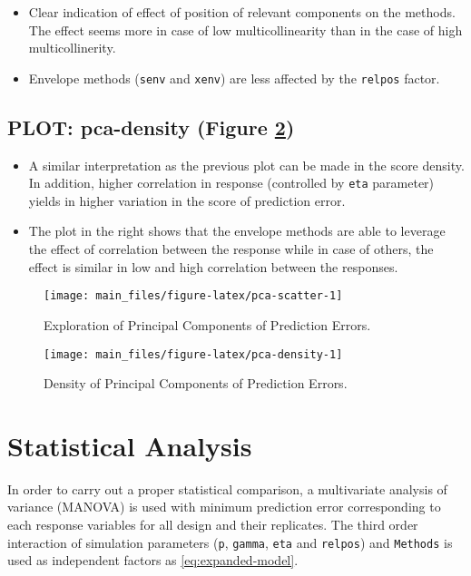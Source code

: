 \documentclass[12pt,3p,authoryear]{elsarticle}
\providecommand{\tightlist}{%
  \setlength{\itemsep}{0pt}\setlength{\parskip}{0pt}}
\begin{document}
\begin{itemize}
\tightlist
\item
  Clear indication of effect of position of relevant components on the
  methods. The effect seems more in case of low multicollinearity than
  in the case of high multicollinerity.
\item
  Envelope methods (\texttt{senv} and \texttt{xenv}) are less affected
  by the \texttt{relpos} factor.
\end{itemize}

\hypertarget{plot-pca-density-figure-reffigpca-density}{%
\subsection{PLOT: pca-density (Figure
\ref{fig:pca-density})}\label{plot-pca-density-figure-reffigpca-density}}

\begin{itemize}
\tightlist
\item
  A similar interpretation as the previous plot can be made in the score
  density. In addition, higher correlation in response (controlled by
  \texttt{eta} parameter) yields in higher variation in the score of
  prediction error.
\item
  The plot in the right shows that the envelope methods are able to
  leverage the effect of correlation between the response while in case
  of others, the effect is similar in low and high correlation between
  the responses.
\end{itemize}

\begin{figure}
\texttt{[image: main\_files/figure-latex/pca-scatter-1]} \caption{Exploration of Principal Components of Prediction Errors.}\label{fig:pca-scatter}
\end{figure}

\begin{figure}
\texttt{[image: main\_files/figure-latex/pca-density-1]} \caption{Density of Principal Components of Prediction Errors.}\label{fig:pca-density}
\end{figure}

\hypertarget{statistical-analysis}{%
\section{Statistical Analysis}\label{statistical-analysis}}

In order to carry out a proper statistical comparison, a multivariate
analysis of variance (MANOVA) is used with minimum prediction error
corresponding to each response variables for all design and their
replicates. The third order interaction of simulation parameters
(\texttt{p}, \texttt{gamma}, \texttt{eta} and \texttt{relpos}) and
\texttt{Methods} is used as independent factors as
\eqref{eq:expanded-model}.
\end{document}

